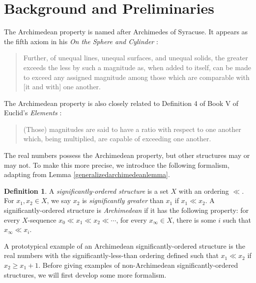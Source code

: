 \documentclass[reqno]{article}
\theoremstyle{definition}
\newtheorem{definition}{Definition}
\begin{document}


\section{Background and Preliminaries}

The Archimedean property is named after Archimedes of Syracuse.
It appears as the fifth axiom in his \emph{On the Sphere
and Cylinder} \cite{archimedes}:
\begin{quote}
    Further, of unequal lines, unequal surfaces, and unequal
    solids, the greater exceeds the less by such a magnitude
    as, when added to itself, can be made to exceed any
    assigned magnitude among those which are comparable with
    [it and with] one another.
\end{quote}
The Archimedean property is also closely related to Definition 4 of Book V of Euclid's
\emph{Elements} \cite{euclid}:
\begin{quote}
    (Those) magnitudes are said to have a ratio
    with respect to one another which, being
    multiplied, are capable of exceeding one
    another.
\end{quote}

The real numbers possess the Archimedean property, but other structures
may or may not. To make this more precise,
we introduce the following formalism, adapting from Lemma \ref{generalizedarchimedeanlemma}.

\begin{definition}
    A \emph{significantly-ordered structure} is a set $X$ with
    an ordering $\ll$.
    For $x_1,x_2\in X$, we say $x_2$ is \emph{significantly greater}
    than $x_1$ if $x_1\ll x_2$.
    A significantly-ordered structure is \emph{Archimedean} if it
    has the following property: for every $X$-sequence
    $x_0\ll x_1\ll x_2 \ll \cdots$,
    for every $x_\infty\in X$, there is some $i$ such that $x_\infty\ll x_i$.
\end{definition}

A prototypical example of an Archimedean significantly-ordered structure is the real
numbers with the significantly-less-than ordering defined such that
$x_1\ll x_2$ if $x_2\geq x_1+1$.
Before giving examples of non-Archimedean significantly-ordered structures,
we will first develop some more formalism.
\end{document}

